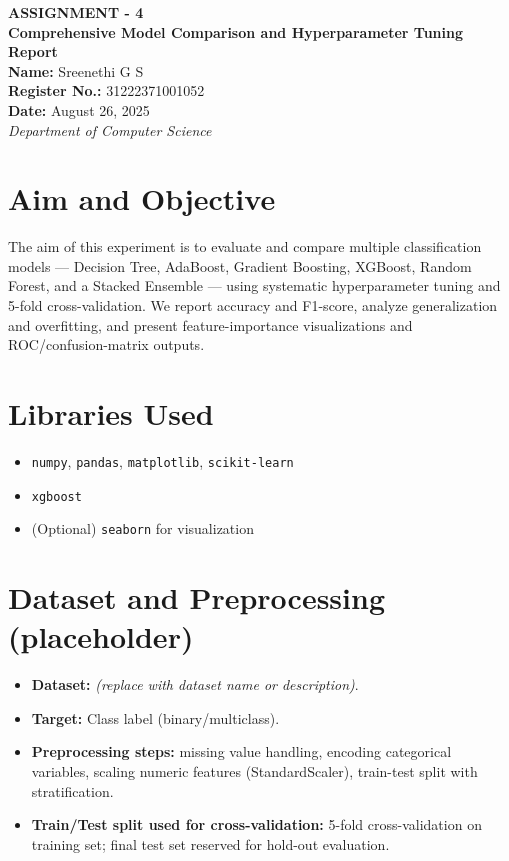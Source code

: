 \documentclass[11pt]{article}
\begin{document}
\begin{titlepage}
    \centering
    \vspace*{3cm} %

    
    {\LARGE \textbf{ASSIGNMENT - 4}}\\[2cm]
    {\LARGE \textbf{Comprehensive Model Comparison and Hyperparameter Tuning Report}}\\[2cm]
    
    {\large \textbf{Name:} Sreenethi G S}\\[0.5cm]
    {\large \textbf{Register No.:} 31222371001052}\\[0.5cm]
    {\large \textbf{Date:} August 26, 2025}\\[3cm]
    
    {\Large \textit{Department of Computer Science}}\\[6cm]
    
    \vfill
\end{titlepage}


\tableofcontents
\newpage

\section{Aim and Objective}
The aim of this experiment is to evaluate and compare multiple classification models — Decision Tree, AdaBoost, Gradient Boosting, XGBoost, Random Forest, and a Stacked Ensemble — using systematic hyperparameter tuning and 5-fold cross-validation. We report accuracy and F1-score, analyze generalization and overfitting, and present feature-importance visualizations and ROC/confusion-matrix outputs.

\section{Libraries Used}
\begin{itemize}
    \item \texttt{numpy}, \texttt{pandas}, \texttt{matplotlib}, \texttt{scikit-learn}
    \item \texttt{xgboost}
    \item (Optional) \texttt{seaborn} for visualization
\end{itemize}

\section{Dataset and Preprocessing (placeholder)}
\begin{itemize}
    \item \textbf{Dataset:} \textit{(replace with dataset name or description)}.
    \item \textbf{Target:} Class label (binary/multiclass).
    \item \textbf{Preprocessing steps:} missing value handling, encoding categorical variables, scaling numeric features (StandardScaler), train-test split with stratification.
    \item \textbf{Train/Test split used for cross-validation:} 5-fold cross-validation on training set; final test set reserved for hold-out evaluation.
\end{itemize}
\end{document}
